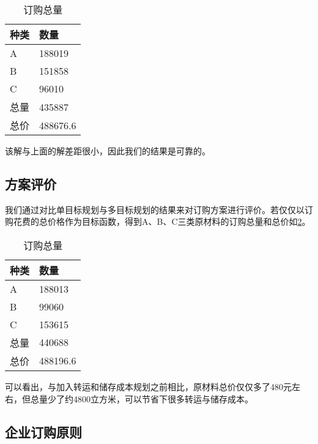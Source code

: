\documentclass[withoutpreface,bwprint]{cumcmthesis} %
\begin{document}
\begin{table}[h]
    \caption{订购总量}\label{Q3_O_A+B+C} \centering
    \centering
    \begin{tabular}{|p{2.0cm}<{\centering}|p{9.0cm}<{\centering}|}
    \hline
    \textbf{种类} & \textbf{数量} \\ \hline
    A           & 188019         \\ \hline
    B           & 151858         \\ \hline
    C           & 96010          \\ \hline
    总量        & 435887 \\ \hline
    总价         & 488676.6          \\ \hline
    \end{tabular}
\end{table}

该解与上面的解差距很小，因此我们的结果是可靠的。

\subsection{方案评价}

我们通过对比单目标规划与多目标规划的结果来对订购方案进行评价。若仅仅以订购花费的总价格作为目标函数，得到A、B、C三类原材料的订购总量和总价如\ref{Q3_O_0}。

\begin{table}[h]
    \caption{订购总量}\label{Q3_O_0} \centering
    \centering
    \begin{tabular}{|p{2.0cm}<{\centering}|p{9.0cm}<{\centering}|}
    \hline
    \textbf{种类} & \textbf{数量} \\ \hline
    A           & 188013         \\ \hline
    B           & 99060         \\ \hline
    C           & 153615          \\ \hline
    总量        & 440688 \\ \hline
    总价         & 488196.6          \\ \hline
    \end{tabular}
\end{table}

可以看出，与加入转运和储存成本规划之前相比，原材料总价仅仅多了480元左右，但总量少了约4800立方米，可以节省下很多转运与储存成本。

\subsection{企业订购原则}
\end{document}
